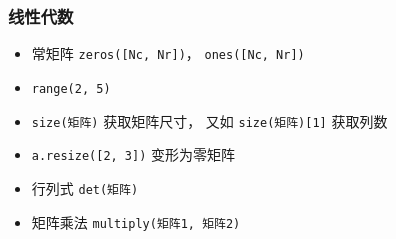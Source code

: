 \subsubsection{线性代数}
\begin{itemize}
\item 常矩阵 \verb|zeros([Nc, Nr])|， \verb|ones([Nc, Nr])|
\item \verb|range(2, 5)|
\item \verb|size(矩阵)| 获取矩阵尺寸， 又如 \verb|size(矩阵)[1]| 获取列数
\item \verb|a.resize([2, 3])| 变形为零矩阵
\item 行列式 \verb|det(矩阵)|
\item 矩阵乘法 \verb|multiply(矩阵1, 矩阵2)|
\end{itemize}
